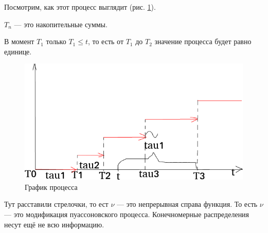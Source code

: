 Посмотрим, как этот процесс выглядит (рис. \ref{fig:36}).

$T_n$ --- это накопительные суммы.

В момент $T_1$ только $T_1 \leq t$, то есть от $T_1$ до $T_2$ значение процесса будет равно единице.

\begin{figure}[h!]
  \centering
  \includegraphics[width=.4\textwidth]{./pictures/3_6.png}
  \caption{График процесса}
  \label{fig:36}
\end{figure}

Тут расставили стрелочки, то ест $ \nu $ --- это непрерывная справа функция.
То есть $ \nu $ --- это модификация пуассоновского процесса.
Конечномерные распределения несут ещё не всю информацию.

